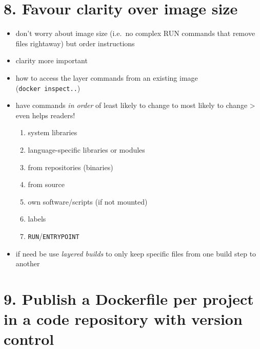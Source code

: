 \documentclass[10pt,letterpaper]{article}
\providecommand{\tightlist}{%
  \setlength{\itemsep}{0pt}\setlength{\parskip}{0pt}}
\begin{document}
\hypertarget{favour-clarity-over-image-size}{%
\section*{8. Favour clarity over image
size}\label{favour-clarity-over-image-size}}

\begin{itemize}
\tightlist
\item
  don't worry about image size (i.e.~no complex RUN commands that remove
  files rightaway) but order instructions
\item
  clarity more important
\item
  how to access the layer commands from an existing image
  (\texttt{docker\ inspect..})
\item
  have commands \emph{in order} of least likely to change to most likely
  to change \textgreater{} even helps readers!

  \begin{enumerate}
  \def\labelenumi{\arabic{enumi}.}
  \tightlist
  \item
    system libraries
  \item
    language-specific libraries or modules
  \item
    from repositories (binaries)
  \item
    from source
  \item
    own software/scripts (if not mounted)
  \item
    labels
  \item
    \texttt{RUN}/\texttt{ENTRYPOINT}
  \end{enumerate}
\item
  if need be use \emph{layered builds} to only keep specific files from
  one build step to another
\end{itemize}

\hypertarget{publish-a-dockerfile-per-project-in-a-code-repository-with-version-control}{%
\section*{9. Publish a Dockerfile per project in a code repository with
version
control}\label{publish-a-dockerfile-per-project-in-a-code-repository-with-version-control}}
\end{document}
